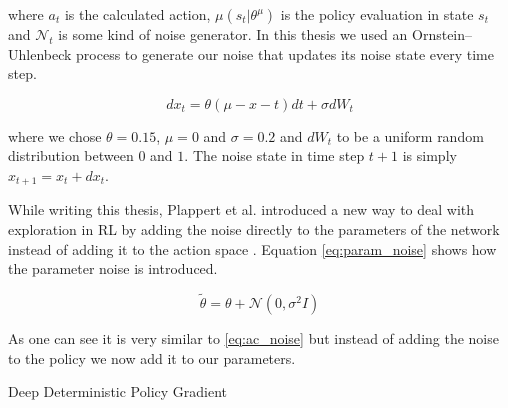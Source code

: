 where $a_t$ is the calculated action, $\mu(s_t | \theta^\mu)$ is the policy evaluation in state $s_t$ and $\mathcal{N}_t$ is some kind of noise generator.
In this thesis we used an Ornstein–Uhlenbeck process to generate our noise that updates its noise state every time step.

\begin{equation}
  dx_t = \theta (\mu - x-t)dt + \sigma d W_t
\end{equation}

where we chose $\theta = 0.15$, $\mu = 0$ and $\sigma = 0.2$ and $dW_t$ to be a uniform random distribution between $0$ and $1$.
The noise state in time step $t+1$ is simply $x_{t+1} = x_t + dx_t$.

While writing this thesis, Plappert et al. introduced a new way to deal with exploration in RL by adding the noise directly to the parameters of the network instead of adding it to the action space \cite{param_noise}.
Equation \ref{eq:param_noise} shows how the parameter noise is introduced.

\begin{equation}
  \label{eq:param_noise}
  \widetilde \theta = \theta + \mathcal{N}(0, \sigma^2 I)
\end{equation}

As one can see it is very similar to \ref{eq:ac_noise} but instead of adding the noise to the policy we now add it to our parameters.

\begin{algorithm}[H]
  \caption{Deep Deterministic Policy Gradient}
  \label{alg:ddpg}
  \begin{algorithmic}[1]
		\EndFor
	\EndFor
  \end{algorithmic}
\end{algorithm}

